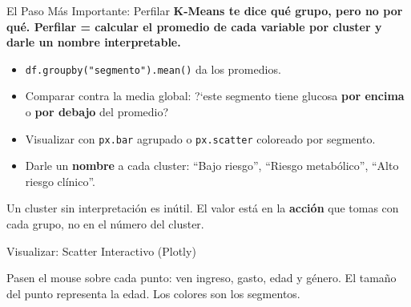 \documentclass[aspectratio=169, 11pt]{beamer}
\begin{document}
\begin{frame}{El Paso M\'as Importante: Perfilar}
  \vspace{-4pt}
  {\footnotesize\color{arcaDark}\bfseries
    K-Means te dice \textbf{qu\'e} grupo, pero no \textbf{por qu\'e}.
    Perfilar = calcular el promedio de cada variable por cluster
    y darle un nombre interpretable.}

  \vspace{6pt}
  {\footnotesize
  \begin{itemize}\setlength{\itemsep}{5pt}
    \item[{\color{arcaRed}\scriptsize\faArrowRight}]
      \texttt{df.groupby("segmento").mean()} da los promedios.
    \item[{\color{arcaRed}\scriptsize\faArrowRight}]
      Comparar contra la media global: ?`este segmento tiene glucosa
      \textbf{por encima} o \textbf{por debajo} del promedio?
    \item[{\color{arcaRed}\scriptsize\faArrowRight}]
      Visualizar con \texttt{px.bar} agrupado o \texttt{px.scatter}
      coloreado por segmento.
    \item[{\color{codeGreen}\scriptsize\faArrowRight}]
      Darle un \textbf{nombre} a cada cluster:
      ``Bajo riesgo'', ``Riesgo metab\'olico'', ``Alto riesgo cl\'inico''.
  \end{itemize}
  }

  \vspace{4pt}
  {\scriptsize\color{textMuted}
    \faLightbulb\hspace{4pt} Un cluster sin interpretaci\'on es in\'util.
    El valor est\'a en la \textbf{acci\'on} que tomas con cada grupo,
    no en el n\'umero del cluster.}
\end{frame}

\begin{frame}[fragile,shrink=18]{Visualizar: Scatter Interactivo (Plotly)}
  \vspace{-6pt}

  \vspace{4pt}
  {\scriptsize\color{arcaDark}
    \faMousePointer\hspace{4pt} Pasen el mouse sobre cada punto:
    ven ingreso, gasto, edad y g\'enero. El tama\~no del punto
    representa la edad. Los colores son los segmentos.}
\end{frame}
\end{document}
